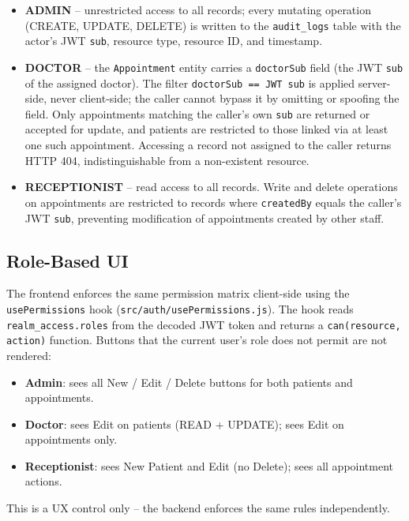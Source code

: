 \documentclass[12pt,a4paper]{report}
\begin{document}
\begin{itemize}
  \item \textbf{ADMIN} -- unrestricted access to all records; every mutating operation (CREATE, UPDATE, DELETE) is written to the \texttt{audit\_logs} table with the actor's JWT \texttt{sub}, resource type, resource ID, and timestamp.
  \item \textbf{DOCTOR} -- the \texttt{Appointment} entity carries a \texttt{doctorSub} field (the JWT \texttt{sub} of the assigned doctor). The filter \texttt{doctorSub == JWT sub} is applied server-side, never client-side; the caller cannot bypass it by omitting or spoofing the field. Only appointments matching the caller's own \texttt{sub} are returned or accepted for update, and patients are restricted to those linked via at least one such appointment. Accessing a record not assigned to the caller returns HTTP 404, indistinguishable from a non-existent resource.
  \item \textbf{RECEPTIONIST} -- read access to all records. Write and delete operations on appointments are restricted to records where \texttt{createdBy} equals the caller's JWT \texttt{sub}, preventing modification of appointments created by other staff.
\end{itemize}

\subsection{Role-Based UI}

The frontend enforces the same permission matrix client-side using the \texttt{usePermissions}
hook (\texttt{src/auth/usePermissions.js}). The hook reads \texttt{realm\_access.roles} from
the decoded JWT token and returns a \texttt{can(resource, action)} function. Buttons that
the current user's role does not permit are not rendered:

\begin{itemize}
  \item \textbf{Admin}: sees all New / Edit / Delete buttons for both patients and appointments.
  \item \textbf{Doctor}: sees Edit on patients (READ + UPDATE); sees Edit on appointments only.
  \item \textbf{Receptionist}: sees New Patient and Edit (no Delete); sees all appointment actions.
\end{itemize}

This is a UX control only -- the backend enforces the same rules independently.
\end{document}
